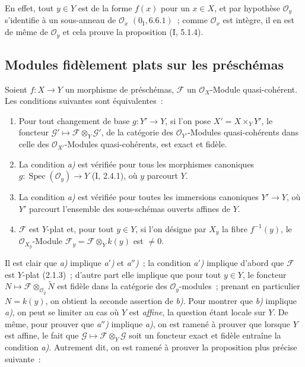 En effet, tout $y\in Y$ est de la forme $f(x)$ pour un $x\in X$, et par
hypothèse $\mathcal O_y$ s'identifie à un sous-anneau de $\mathcal O_x$
$(0_{\mathrm I},6.6.1)$~; comme $\mathcal O_x$ est intègre, il en est de même
de $\mathcal O_y$ et cela prouve la proposition (I, 5.1.4).

\subsection{Modules fidèlement plats sur les préschémas}
\label{subsection:IV.2.2-fr}

\begin{proposition}[2.2.1]
\label{IV.2.2.1-fr}
Soient $f:X\to Y$ un morphisme de préschémas, $\mathscr F$ un
$\mathcal O_X$-Module quasi-cohérent. Les conditions suivantes sont
équivalentes~:
\begin{enumerate}
\item[\emph{a)}] Pour tout changement de base $g:Y'\to Y$, si l'on pose
$X'=X\times_Y Y'$, le foncteur
$\mathscr G'\mapsto\mathscr F\otimes_Y\mathscr G'$, de la catégorie des
$\mathcal O_{Y'}$-Modules quasi-cohérents dans celle des
$\mathcal O_{X'}$-Modules quasi-cohérents, est exact et fidèle.
\item[\emph{a$'$)}] La condition \emph{a)} est vérifiée pour tous les
morphismes canoniques $g:\operatorname{Spec}(\mathcal O_y)\to Y$ (I, 2.4.1),
où $y$ parcourt $Y$.
\item[\emph{a$''$)}] La condition \emph{a)} est vérifiée pour toutes les
immersions canoniques $Y'\to Y$, où $Y'$ parcourt l'ensemble des
sous-schémas ouverts affines de $Y$.
\item[\emph{b)}] $\mathscr F$ est $Y$-plat et, pour tout $y\in Y$, si l'on
désigne par $X_y$ la fibre $f^{-1}(y)$, le $\mathcal O_{X_y}$-Module
$\mathscr F_y=\mathscr F\otimes_Y k(y)$ est $\neq0$.
\end{enumerate}
\end{proposition}

Il est clair que \emph{a)} implique \emph{a$'$)} et \emph{a$''$)}~; la
condition \emph{a$'$)} implique d'abord que $\mathscr F$ est $Y$-plat
(2.1.3)~; d'autre part elle implique que pour tout $y\in Y$, le foncteur
$N\mapsto\mathscr F\otimes_{\mathcal O_y}\widetilde N$ est fidèle dans la
catégorie des $\mathcal O_y$-modules~; prenant en particulier $N=k(y)$, on
obtient la seconde assertion de \emph{b)}. Pour montrer que \emph{b)}
implique \emph{a)}, on peut se limiter au cas où $Y$ est \emph{affine}, la
question étant locale sur $Y$. De même, pour prouver que \emph{a$''$)}
implique \emph{a)}, on est ramené à prouver que lorsque $Y$ est affine, le
fait que $\mathscr G\mapsto\mathscr F\otimes_Y\mathscr G$ soit un foncteur
exact et fidèle entraîne la condition \emph{a)}. Autrement dit, on est ramené
à prouver la proposition plus précise suivante~:

